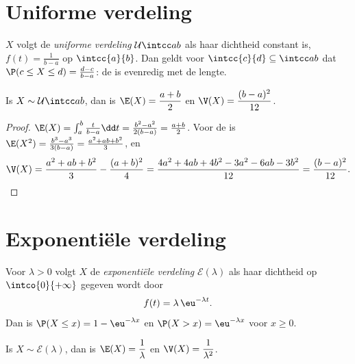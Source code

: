 \section{Uniforme verdeling}

\begin{definition}\label{def:g12:contdist:uniform}
$X$ volgt de \emph{uniforme verdeling}
$\mathcal U\intcc ab$ als haar dichtheid constant is,
$f(t) = \frac{1}{b-a}$ op $\intcc{a}{b}$. Dan geldt voor
$\intcc{c}{d} \subseteq \intcc ab$ dat
$\P(c \leq X \leq d) = \frac{d - c}{b - a}$: de  is evenredig met de
lengte.
\end{definition}

\begin{proposition}\label{prop:g12:contdist:uniformmoments}
Is $X \sim \mathcal U\intcc ab$, dan is
$\E(X) = \dfrac{a+b}{2}$ en $\V(X) = \dfrac{(b-a)^2}{12}$.
\end{proposition}

\begin{proof}
$\E(X) = \int_a^b \frac{t}{b-a}\dd t = \frac{b^2 - a^2}{2(b-a)} =
\frac{a+b}{2}$. Voor de  is
$\E(X^2) = \frac{b^3 - a^3}{3(b-a)} = \frac{a^2 + ab + b^2}{3}$, en
\[
\V(X) = \frac{a^2 + ab + b^2}{3} - \frac{(a+b)^2}{4}
= \frac{4a^2 + 4ab + 4b^2 - 3a^2 - 6ab - 3b^2}{12}
= \frac{(b - a)^2}{12}. \qedhere
\]
\end{proof}

\section{Exponentiële verdeling}

\begin{definition}\label{def:g12:contdist:expo}
Voor $\lambda > 0$ volgt $X$ de \emph{exponentiële
verdeling} $\mathcal E(\lambda)$ als haar
dichtheid op $\intco{0}{+\infty}$ gegeven wordt door
\[
f(t) = \lambda\,\eu^{-\lambda t}.
\]
Dan is $\P(X \leq x) = 1 - \eu^{-\lambda x}$ en
$\P(X > x) = \eu^{-\lambda x}$ voor $x \geq 0$.
\end{definition}

\begin{proposition}\label{prop:g12:contdist:expomoments}
Is $X \sim \mathcal E(\lambda)$, dan is $\E(X) = \dfrac{1}{\lambda}$ en
$\V(X) = \dfrac{1}{\lambda^2}$.
\end{proposition}

